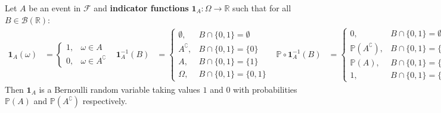 \documentclass{huhtakm-template-book}
\newcommand{\prob}{\mathbb{P}}
\begin{document}
    \begin{eg}
        Let $A$ be an event in $\mathcal{F}$ and \textbf{indicator functions} $\mathbf{1}_{A}:\Omega\to\mathbb{R}$ such that for all $B\in\mathcal{B}(\mathbb{R})$:
        \begin{align*}
            \mathbf{1}_{A}(\omega)&=\begin{cases}
                1, &\omega\in A\\
                0, &\omega\in A^{\complement}
            \end{cases} & \mathbf{1}_{A}^{-1}(B)&=\begin{cases}
                \emptyset, &B\cap\{0,1\}=\emptyset\\
                A^{\complement}, & B\cap\{0,1\}=\{0\}\\
                A, &B\cap\{0,1\}=\{1\}\\
                \Omega, &B\cap\{0,1\}=\{0,1\}
            \end{cases} & \prob\circ \mathbf{1}_{A}^{-1}(B)&=\begin{cases}
                0, &B\cap\{0,1\}=\emptyset\\
                \prob(A^{\complement}), & B\cap\{0,1\}=\{0\}\\
                \prob(A), &B\cap\{0,1\}=\{1\}\\
                1, &B\cap\{0,1\}=\{0,1\}
            \end{cases}
        \end{align*}
        Then $\mathbf{1}_{A}$ is a Bernoulli random variable taking values $1$ and $0$ with probabilities $\prob(A)$ and $\prob(A^{\complement})$ respectively.
    \end{eg}
\end{document}
